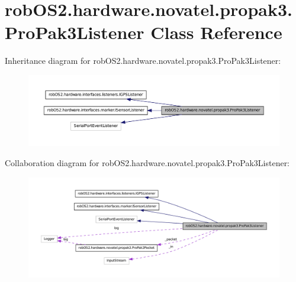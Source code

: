 \hypertarget{classrob_o_s2_1_1hardware_1_1novatel_1_1propak3_1_1_pro_pak3_listener}{
\section{robOS2.hardware.novatel.propak3.ProPak3Listener Class Reference}
\label{classrob_o_s2_1_1hardware_1_1novatel_1_1propak3_1_1_pro_pak3_listener}
}


Inheritance diagram for robOS2.hardware.novatel.propak3.ProPak3Listener:\nopagebreak
\begin{figure}[H]
\begin{center}
\leavevmode
\includegraphics[width=400pt]{classrob_o_s2_1_1hardware_1_1novatel_1_1propak3_1_1_pro_pak3_listener__inherit__graph}
\end{center}
\end{figure}


Collaboration diagram for robOS2.hardware.novatel.propak3.ProPak3Listener:\nopagebreak
\begin{figure}[H]
\begin{center}
\leavevmode
\includegraphics[width=400pt]{classrob_o_s2_1_1hardware_1_1novatel_1_1propak3_1_1_pro_pak3_listener__coll__graph}
\end{center}
\end{figure}
